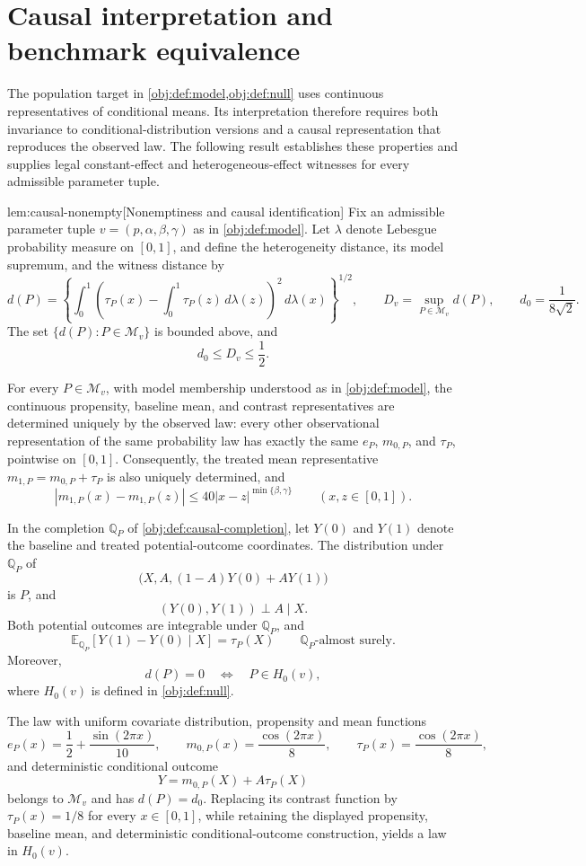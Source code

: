 \section{Causal interpretation and benchmark equivalence}

The population target in \cref{obj:def:model,obj:def:null} uses continuous representatives of conditional means. Its interpretation therefore requires both invariance to conditional-distribution versions and a causal representation that reproduces the observed law. The following result establishes these properties and supplies legal constant-effect and heterogeneous-effect witnesses for every admissible parameter tuple.

\begin{lemmav}{lem:causal-nonempty}[Nonemptiness and causal identification]
Fix an admissible parameter tuple \(v=(p,\alpha,\beta,\gamma)\) as in \cref{obj:def:model}. Let \(\lambda\) denote Lebesgue probability measure on \([0,1]\), and define the heterogeneity distance, its model supremum, and the witness distance by
\[
d(P)=
\left\{\int_0^1
\left(\tau_P(x)-\int_0^1\tau_P(z)\,d\lambda(z)\right)^2
\,d\lambda(x)\right\}^{1/2},
\qquad
D_v=\sup_{P\in\mathcal M_v}d(P),
\qquad
d_0=\frac{1}{8\sqrt{2}}.
\]
The set \(\{d(P):P\in\mathcal M_v\}\) is bounded above, and
\[
d_0\le D_v\le\frac12.
\]

For every \(P\in\mathcal M_v\), with model membership understood as in \cref{obj:def:model}, the continuous propensity, baseline mean, and contrast representatives are determined uniquely by the observed law: every other observational representation of the same probability law has exactly the same \(e_P\), \(m_{0,P}\), and \(\tau_P\), pointwise on \([0,1]\). Consequently, the treated mean representative \(m_{1,P}=m_{0,P}+\tau_P\) is also uniquely determined, and
\[
|m_{1,P}(x)-m_{1,P}(z)|
\le 40|x-z|^{\min\{\beta,\gamma\}}
\qquad (x,z\in[0,1]).
\]

In the completion \(\mathbb Q_P\) of \cref{obj:def:causal-completion}, let \(Y(0)\) and \(Y(1)\) denote the baseline and treated potential-outcome coordinates. The distribution under \(\mathbb Q_P\) of
\[
\bigl(X,A,(1-A)Y(0)+AY(1)\bigr)
\]
is \(P\), and
\[
(Y(0),Y(1))\perp A\mid X.
\]
Both potential outcomes are integrable under \(\mathbb Q_P\), and
\[
\mathbb E_{\mathbb Q_P}\!\left[Y(1)-Y(0)\mid X\right]
=\tau_P(X)
\qquad \mathbb Q_P\text{-almost surely}.
\]
Moreover,
\[
d(P)=0\quad\Longleftrightarrow\quad P\in H_0(v),
\]
where \(H_0(v)\) is defined in \cref{obj:def:null}.

The law with uniform covariate distribution, propensity and mean functions
\[
e_P(x)=\frac12+\frac{\sin(2\pi x)}{10},
\qquad
m_{0,P}(x)=\frac{\cos(2\pi x)}8,
\qquad
\tau_P(x)=\frac{\cos(2\pi x)}8,
\]
and deterministic conditional outcome
\[
Y=m_{0,P}(X)+A\tau_P(X)
\]
belongs to \(\mathcal M_v\) and has \(d(P)=d_0\). Replacing its contrast function by \(\tau_P(x)=1/8\) for every \(x\in[0,1]\), while retaining the displayed propensity, baseline mean, and deterministic conditional-outcome construction, yields a law in \(H_0(v)\).
\end{lemmav}

